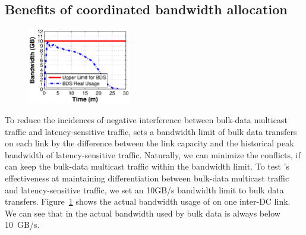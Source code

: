 \subsection{Benefits of coordinated bandwidth allocation}
\label{subsec:evaluation:separation}
\begin{figure}[t]
  \centering
  \includegraphics[width=45mm]{images/Quota_v2.eps}%
  \label{fig:quota}
\vspace{-0.2cm}
\end{figure}

To reduce the incidences of negative interference between bulk-data
multicast traffic and latency-sensitive traffic, \company sets a
bandwidth limit of bulk data transfers on each link by the difference
between the link capacity and the historical peak bandwidth of
latency-sensitive traffic. Naturally, we can minimize the conflicts,
if \name can keep the bulk-data multicast traffic within the bandwidth
limit. To test \name's effectiveness at maintaining differentiation between
bulk-data multicast traffic and latency-sensitive traffic, we set an
10GB/s bandwidth limit to bulk data transfers.
Figure~\ref{fig:quota} shows the actual bandwidth usage of \name on
one inter-DC link. We can see that in \name the actual bandwidth used
by bulk data is always below 10~GB/s.


